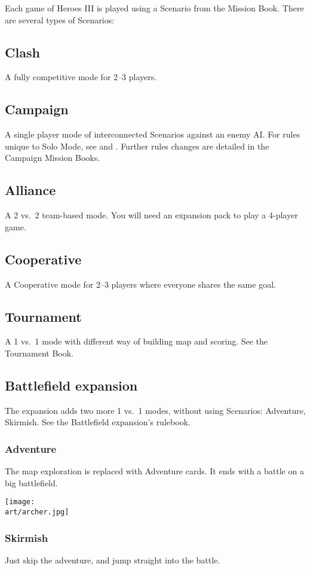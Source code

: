
\begin{multicols*}{2}

Each game of Heroes III is played using a Scenario from the Mission Book.
There are several types of Scenarios:

\subsection*{Clash}
A fully competitive mode for 2--3 players.

\subsection*{Campaign}
A single player mode of interconnected Scenarios against an enemy AI.
For rules unique to Solo Mode, see  and .
Further rules changes are detailed in the Campaign Mission Books.

\subsection*{Alliance}
A 2 vs.~2 team-based mode.
You will need an expansion pack to play a 4-player game.

\subsection*{Cooperative}
A Cooperative mode for 2--3 players where everyone shares the same goal.

\subsection*{Tournament}
A 1 vs.~1 mode with different way of building map and scoring. See the Tournament Book.

\subsection*{Battlefield expansion}
The expansion adds two more 1 vs.~1 modes, without using Scenarios: Adventure, Skirmish. See the Battlefield expansion's rulebook.

\subsubsection*{Adventure}
The map exploration is replaced with Adventure cards. It ends with a battle on a big battlefield.

\texttt{[image: \\art/archer.jpg]}

\subsubsection*{Skirmish}
Just skip the adventure, and jump straight into the battle.

\end{multicols*}
